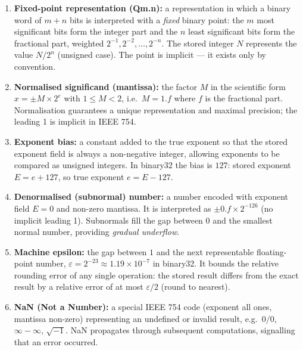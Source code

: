 \documentclass[11pt]{article}
\newcommand{\cle}[1]{{\popxbold\color{popdark}#1}}
\begin{document}
\begin{corrige}
\begin{enumerate}
\item \textbf{\cle{Fixed-point representation (Qm.n)}:} a representation in which a binary word of $m+n$ bits is interpreted with a \emph{fixed} binary point: the $m$ most significant bits form the integer part and the $n$ least significant bits form the fractional part, weighted $2^{-1}, 2^{-2}, \ldots, 2^{-n}$. The stored integer $N$ represents the value $N/2^{n}$ (unsigned case). The point is implicit — it exists only by convention.
\item \textbf{\cle{Normalised significand (mantissa)}:} the factor $M$ in the scientific form $x = \pm M\times 2^{e}$ with $1 \le M < 2$, i.e.\ $M = 1.f$ where $f$ is the fractional part. Normalisation guarantees a unique representation and maximal precision; the leading 1 is implicit in IEEE 754.
\item \textbf{\cle{Exponent bias}:} a constant added to the true exponent so that the stored exponent field is always a non-negative integer, allowing exponents to be compared as unsigned integers. In binary32 the bias is $127$: stored exponent $E = e + 127$, so true exponent $e = E - 127$.
\item \textbf{\cle{Denormalised (subnormal) number}:} a number encoded with exponent field $E = 0$ and non-zero mantissa. It is interpreted as $\pm 0.f\times 2^{-126}$ (no implicit leading 1). Subnormals fill the gap between 0 and the smallest normal number, providing \emph{gradual underflow}.
\item \textbf{\cle{Machine epsilon}:} the gap between $1$ and the next representable floating-point number, $\varepsilon = 2^{-23}\approx 1.19\times 10^{-7}$ in binary32. It bounds the relative rounding error of any single operation: the stored result differs from the exact result by a relative error of at most $\varepsilon/2$ (round to nearest).
\item \textbf{\cle{NaN (Not a Number)}:} a special IEEE 754 code (exponent all ones, mantissa non-zero) representing an undefined or invalid result, e.g.\ $0/0$, $\infty - \infty$, $\sqrt{-1}$. NaN propagates through subsequent computations, signalling that an error occurred.
\end{enumerate}
\end{corrige}
\end{document}
